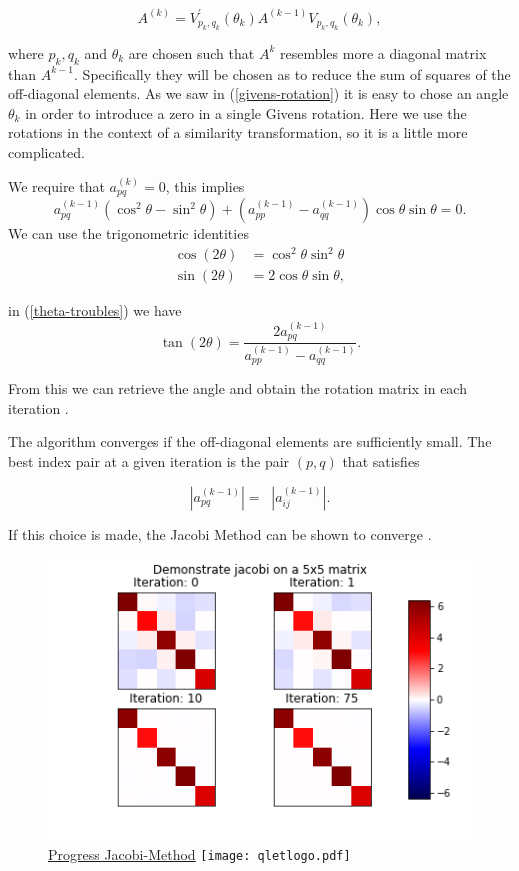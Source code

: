 \documentclass[12pt]{article}
\begin{document}
\begin{equation}
A^{(k)} = V^{\prime}_{p_k, q_k}(\theta_k) A^{(k-1)} V_{p_k, q_k}(\theta_k),
\end{equation}

where $p_k, q_k$ and $\theta_k$ are chosen such that $A^{k}$ resembles more a diagonal matrix than $A^{k-1}$.  Specifically they will be chosen as to reduce the sum of squares of the off-diagonal elements. As we saw in (\ref{givens-rotation}) it is easy to chose an angle $\theta_k$ in order to introduce a zero in a single Givens rotation. Here we use the rotations in the context of a similarity transformation, so it is a little more complicated.

We require that $a_{pq}^{(k)} = 0$, this implies
\begin{equation}
\label{theta-troubles}
a^{(k-1)}_{pq} (\cos^2\theta - \sin^2\theta) + \left( a^{(k-1)}_{pp} - a^{(k-1)}_{qq} \right) \cos\theta \sin\theta = 0.
\end{equation}
We can use the trigonometric identities
\begin{align*}
\cos(2\theta) &= \cos^2 \theta \sin^2 \theta \\
\sin(2\theta) &= 2 \cos\theta \sin\theta,
\end{align*}

in (\ref{theta-troubles}) we have
$$\tan(2\theta) = \frac{2a^{(k-1)}_{pq}}{a^{(k-1)}_{pp} - a^{(k-1)}_{qq}}.$$

From this we can retrieve the angle and obtain the rotation matrix in each iteration \cite{NLA}.

The algorithm converges if the off-diagonal elements are sufficiently small. The best index pair at a given iteration is the pair $(p, q)$ that satisfies
 
\[
|a^{(k-1)}_{pq}| = \mathop{\max_{i<j}} |a^{(k-1)}_{ij}|.
\]

If this choice is made, the Jacobi Method can be shown to converge \cite{NLA}.

\begin{figure}
\begin{center}
\caption{\href {https://github.com/thsis/NIS18/tree/master/media/plots}{Progress Jacobi-Method}  \protect\texttt{[image: qletlogo.pdf]}}
  \label{j-plot}  
  \includegraphics[scale=0.6]{../media/plots/jacobi.png}
\end{center}
\end{figure}
\end{document}
